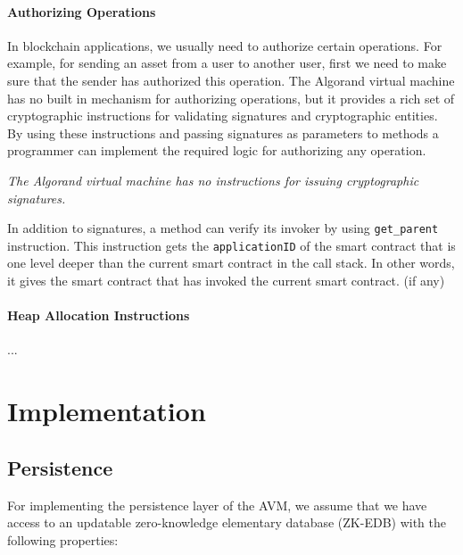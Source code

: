 \documentclass[11pt, A4]{report}
\begin{document}
    \subsubsection{Authorizing Operations}

    In blockchain applications, we usually need to authorize certain operations. For example, for sending an asset
    from a user to another user, first we need to make sure that the sender has authorized this operation. The
    Algorand virtual machine has no built in mechanism for authorizing operations, but it provides a rich set of
    cryptographic instructions for validating signatures and cryptographic entities. By using these instructions and
    passing signatures as parameters to methods a programmer can implement the required logic for authorizing any
    operation.

    \emph{The Algorand virtual machine has no instructions for issuing cryptographic signatures.}

    In addition to signatures, a method can verify its invoker by using \texttt{get\_parent} instruction. This
    instruction gets the \texttt{applicationID} of the smart contract that is one level deeper than the current
    smart contract in the call stack. In other words, it gives the smart contract that has invoked the current smart
    contract. (if any)

    \subsubsection{Heap Allocation Instructions}

    ...


    \chapter{Implementation}\label{ch:implementation}


    \section{Persistence}\label{sec:persistence}

    For implementing the persistence layer of the AVM, we assume that we have access to an updatable zero-knowledge
    elementary database (ZK-EDB) with the following properties:
\end{document}
